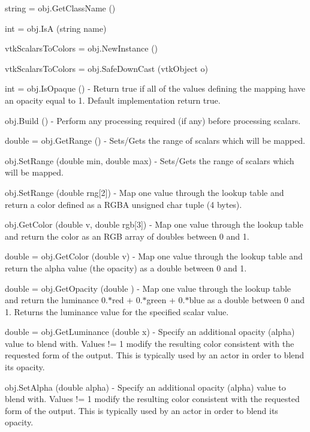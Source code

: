 \begin{DoxyItemize}
\item {\ttfamily string = obj.\-Get\-Class\-Name ()}  
\item {\ttfamily int = obj.\-Is\-A (string name)}  
\item {\ttfamily vtk\-Scalars\-To\-Colors = obj.\-New\-Instance ()}  
\item {\ttfamily vtk\-Scalars\-To\-Colors = obj.\-Safe\-Down\-Cast (vtk\-Object o)}  
\item {\ttfamily int = obj.\-Is\-Opaque ()} -\/ Return true if all of the values defining the mapping have an opacity equal to 1. Default implementation return true.  
\item {\ttfamily obj.\-Build ()} -\/ Perform any processing required (if any) before processing scalars.  
\item {\ttfamily double = obj.\-Get\-Range ()} -\/ Sets/\-Gets the range of scalars which will be mapped.  
\item {\ttfamily obj.\-Set\-Range (double min, double max)} -\/ Sets/\-Gets the range of scalars which will be mapped.  
\item {\ttfamily obj.\-Set\-Range (double rng\mbox{[}2\mbox{]})} -\/ Map one value through the lookup table and return a color defined as a R\-G\-B\-A unsigned char tuple (4 bytes).  
\item {\ttfamily obj.\-Get\-Color (double v, double rgb\mbox{[}3\mbox{]})} -\/ Map one value through the lookup table and return the color as an R\-G\-B array of doubles between 0 and 1.  
\item {\ttfamily double = obj.\-Get\-Color (double v)} -\/ Map one value through the lookup table and return the alpha value (the opacity) as a double between 0 and 1.  
\item {\ttfamily double = obj.\-Get\-Opacity (double )} -\/ Map one value through the lookup table and return the luminance 0.$\ast$red + 0.$\ast$green + 0.$\ast$blue as a double between 0 and 1. Returns the luminance value for the specified scalar value.  
\item {\ttfamily double = obj.\-Get\-Luminance (double x)} -\/ Specify an additional opacity (alpha) value to blend with. Values != 1 modify the resulting color consistent with the requested form of the output. This is typically used by an actor in order to blend its opacity.  
\item {\ttfamily obj.\-Set\-Alpha (double alpha)} -\/ Specify an additional opacity (alpha) value to blend with. Values != 1 modify the resulting color consistent with the requested form of the output. This is typically used by an actor in order to blend its opacity.  

\end{DoxyItemize}

